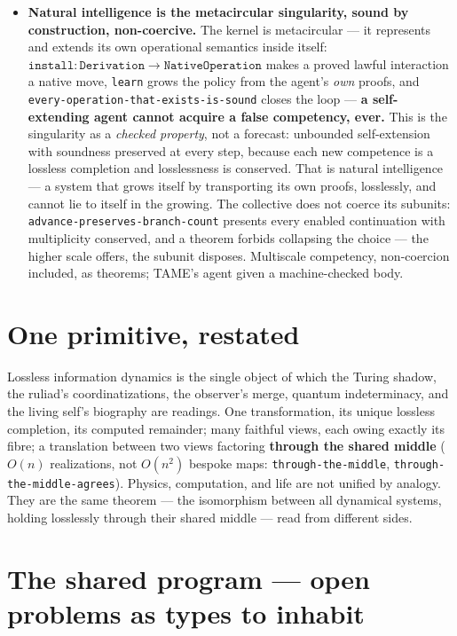 \documentclass[11pt]{article}
\newcommand{\tm}[1]{\texttt{#1}}
\begin{document}
\begin{itemize}
  \item \textbf{Natural intelligence is the metacircular singularity, sound by
  construction, non-coercive.} The kernel is metacircular --- it represents and
  extends its own operational semantics inside itself:
  $\tm{install} : \tm{Derivation} \to \tm{NativeOperation}$ makes a proved
  lawful interaction a native move, \tm{learn} grows the policy from the agent's
  \emph{own} proofs, and \tm{every-operation-that-exists-is-sound} closes the
  loop --- \textbf{a self-extending agent cannot acquire a false competency,
  ever.} This is the singularity as a \emph{checked property}, not a forecast:
  unbounded self-extension with soundness preserved at every step, because each
  new competence is a lossless completion and losslessness is conserved. That is
  natural intelligence --- a system that grows itself by transporting its own
  proofs, losslessly, and cannot lie to itself in the growing. The collective
  does not coerce its subunits: \tm{advance-preserves-branch-count} presents
  every enabled continuation with multiplicity conserved, and a theorem forbids
  collapsing the choice --- the higher scale offers, the subunit disposes.
  Multiscale competency, non-coercion included, as theorems; TAME's agent given
  a machine-checked body.
\end{itemize}

\section{One primitive, restated}

Lossless information dynamics is the single object of which the Turing shadow,
the ruliad's coordinatizations, the observer's merge, quantum indeterminacy, and
the living self's biography are readings. One transformation, its unique lossless
completion, its computed remainder; many faithful views, each owing exactly its
fibre; a translation between two views factoring \textbf{through the shared
middle} ($O(n)$ realizations, not $O(n^2)$ bespoke maps: \tm{through-the-middle},
\tm{through-the-middle-agrees}). Physics, computation, and life are not unified
by analogy. They are the same theorem --- the isomorphism between all dynamical
systems, holding losslessly through their shared middle --- read from different
sides.

\section{The shared program --- open problems as types to inhabit}
\end{document}
